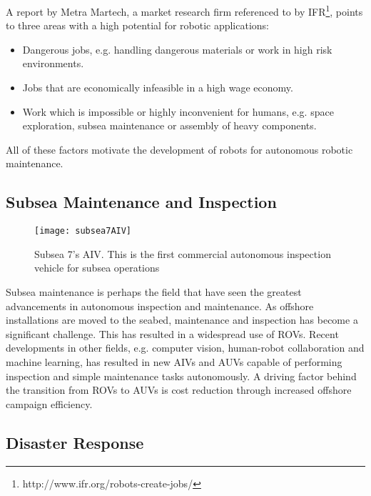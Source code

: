 A report by Metra Martech\cite{metraMartechGorle}, a market research firm referenced to by \ac{IFR}\footnote{http://www.ifr.org/robots-create-jobs/}, points to three areas with a high potential for robotic applications:

\begin{itemize}
	\item Dangerous jobs, e.g. handling dangerous materials or work in high risk environments.
	\item Jobs that are economically infeasible in a high wage economy.
	\item Work which is impossible or highly inconvenient for humans, e.g. space exploration, subsea maintenance or assembly of heavy components.
\end{itemize}

All of these factors motivate the development of robots for autonomous robotic maintenance. 

\subsection{Subsea Maintenance and Inspection}

\begin{wrapfigure}{r}{0.5\textwidth}
	\vspace{-20pt}
	\begin{center}
		\texttt{[image: subsea7AIV]}
	\end{center}
	
	\caption{Subsea 7's AIV. This is the first commercial autonomous inspection vehicle for subsea operations \cite{pressAIV}}
\end{wrapfigure}

Subsea maintenance is perhaps the field that have seen the greatest advancements in autonomous inspection and maintenance. As offshore installations are moved to the seabed, maintenance and inspection has become a significant challenge. This has resulted in a widespread use of \acp{ROV}. Recent developments in other fields, e.g. computer vision, human-robot collaboration and machine learning, has resulted in new \acp{AIV} and \acp{AUV} capable of performing inspection and simple maintenance tasks autonomously\cite{subseaAIV}\cite{Ridao2015227}. A driving factor behind the transition from \acp{ROV} to \acp{AUV} is cost reduction through increased offshore campaign efficiency.

\subsection{Disaster Response}


